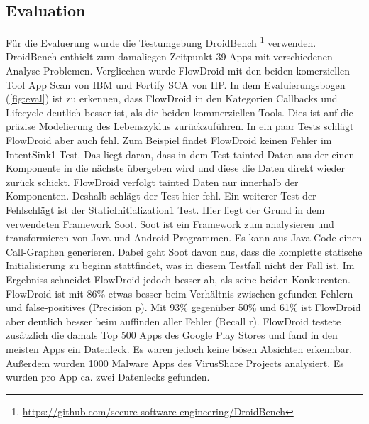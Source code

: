 \documentclass[runningheads]{llncs}
\begin{document}
\subsection{Evaluation}
Für die Evaluerung wurde die Testumgebung DroidBench \footnote{\url{https://github.com/secure-software-engineering/DroidBench}} verwenden. DroidBench enthielt zum damaliegen Zeitpunkt 39 Apps mit verschiedenen Analyse Problemen. Vergliechen wurde FlowDroid mit den beiden komerziellen Tool App Scan von IBM und Fortify SCA von HP. 
In dem Evaluierungsbogen (\ref{fig:eval}) ist zu erkennen, dass FlowDroid in den Kategorien Callbacks und Lifecycle deutlich besser ist, als die beiden kommerziellen Tools. Dies ist auf die präzise Modelierung des Lebenszyklus zurückzuführen. In ein paar Tests schlägt FlowDroid aber auch fehl. Zum Beispiel findet FlowDroid keinen Fehler im IntentSink1 Test. Das liegt daran, dass in dem Test tainted Daten aus der einen Komponente in die nächste übergeben wird und diese die Daten direkt wieder zurück schickt. FlowDroid verfolgt tainted Daten nur innerhalb der Komponenten. Deshalb schlägt der Test hier fehl. Ein weiterer Test der Fehlschlägt ist der StaticInitialization1 Test. Hier liegt der Grund in dem verwendeten Framework Soot. Soot ist ein Framework zum analysieren und transformieren von Java und Android Programmen. Es kann aus Java Code einen Call-Graphen generieren. Dabei geht Soot davon aus, dass die komplette statische Initialisierung zu beginn stattfindet, was in diesem Testfall nicht der Fall ist.
Im Ergebniss schneidet FlowDroid jedoch besser ab, als seine beiden Konkurenten. FlowDroid ist mit 86\% etwas besser beim Verhältnis zwischen gefunden Fehlern und false-positives (Precision p). Mit 93\% gegenüber 50\% und 61\% ist FlowDroid aber deutlich besser beim auffinden aller Fehler (Recall r).
FlowDroid testete zusätzlich die damals Top 500 Apps des Google Play Stores und fand in den meisten Apps ein Datenleck. Es waren jedoch keine bösen Absichten erkennbar. Außerdem wurden 1000 Malware Apps des VirusShare Projects analysiert. Es wurden pro App ca. zwei Datenlecks gefunden.
\end{document}
